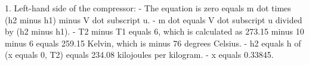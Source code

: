 1. Left-hand side of the compressor:
   - The equation is zero equals m dot times (h2 minus h1) minus V dot subscript u.
   - m dot equals V dot subscript u divided by (h2 minus h1).
   - T2 minus T1 equals 6, which is calculated as 273.15 minus 10 minus 6 equals 259.15 Kelvin, which is minus 76 degrees Celsius.
   - h2 equals h of (x equals 0, T2) equals 234.08 kilojoules per kilogram.
   - x equals 0.33845.